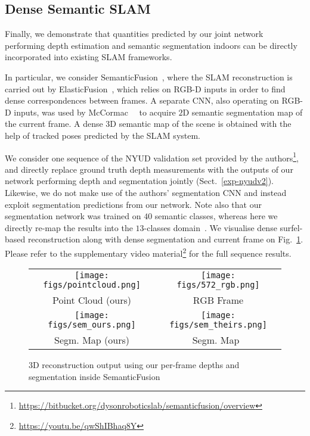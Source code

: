 \documentclass[letterpaper, 10 pt, conference]{ieeeconf}
\begin{document}
\subsection{Dense Semantic SLAM}
\label{subsec:ext3}
Finally, we demonstrate that quantities predicted by our joint network performing depth estimation and semantic segmentation indoors can be directly incorporated into existing SLAM frameworks.

In particular, we consider SemanticFusion~\cite{McCormacHDL17}, where the SLAM reconstruction is carried out by ElasticFusion~\cite{whelan2016elasticfusion}, which relies on RGB-D inputs in order to find dense correspondences between frames. A separate CNN, also operating on RGB-D inputs, was used by McCormac~\etal~\cite{McCormacHDL17} to acquire $2$D semantic segmentation map of the current frame. A dense $3$D semantic map of the scene is obtained with the help of tracked poses predicted by the SLAM system.

We consider one sequence of the NYUD validation set provided by the authors\footnote{\url{https://bitbucket.org/dysonroboticslab/semanticfusion/overview}}, and directly replace ground truth depth measurements with the outputs of our network performing depth and segmentation jointly (Sect.~\ref{exp-nyudv2}). Likewise, we do not make use of the authors' segmentation CNN and instead exploit segmentation predictions from our network. Note also that our segmentation network was trained on $40$ semantic classes, whereas here we directly re-map the results into the $13$-classes domain~\cite{couprie2013indoor}. We visualise dense surfel-based reconstruction along with dense segmentation and current frame on Fig.~\ref{fig:semfus}. Please refer to the supplementary video material\footnote{\url{https://youtu.be/qwShIBhaq8Y}} for the full sequence results.


\begin{figure}
	\centering
	\begin{tabular}{cc}
		\texttt{[image: figs/pointcloud.png]} &
		\texttt{[image: figs/572\_rgb.png]}\\
		Point Cloud (ours) & RGB Frame \\
		\texttt{[image: figs/sem\_ours.png]} &
		\texttt{[image: figs/sem\_theirs.png]}\\
		Segm. Map (ours) & Segm. Map~\cite{McCormacHDL17}
	\end{tabular}
	\caption{3D reconstruction output using our per-frame depths and segmentation inside SemanticFusion~\cite{McCormacHDL17}
	\label{fig:semfus}}
	\vskip -0.2in
\end{figure}
\end{document}
